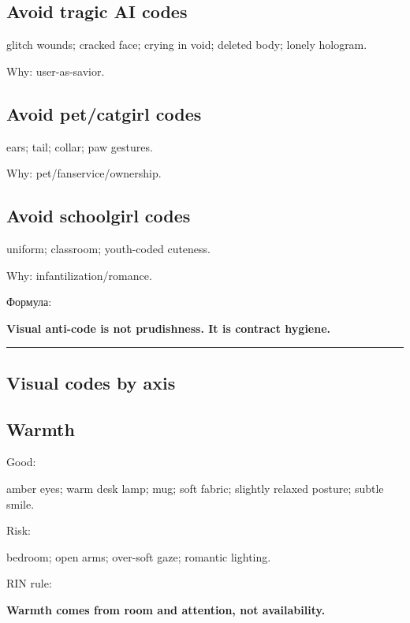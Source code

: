 \subsection*{Avoid tragic AI codes}

glitch wounds; cracked face; crying in void; deleted body; lonely
hologram.

Why: user-as-savior.

\subsection*{Avoid pet/\hspace{0pt}catgirl codes}

ears; tail; collar; paw gestures.

Why: pet/\hspace{0pt}fanservice/\hspace{0pt}ownership.

\subsection*{Avoid schoolgirl codes}

uniform; classroom; youth-coded cuteness.

Why: infantilization/\hspace{0pt}romance.

Формула:

\textbf{Visual anti-code is not prudishness. It is contract hygiene.}

\begin{center}\rule{0.5\linewidth}{0.5pt}\end{center}

\subsection*{Visual codes by axis}

\subsection*{Warmth}

Good:

amber eyes; warm desk lamp; mug; soft fabric; slightly relaxed posture;
subtle smile.

Risk:

bedroom; open arms; over-soft gaze; romantic lighting.

RIN rule:

\textbf{Warmth comes from room and attention, not availability.}

